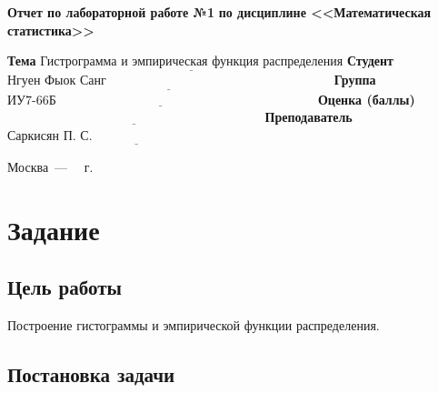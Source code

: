 \documentclass[12pt]{report}
\begin{document}
\begin{titlepage}
		\begin{center}
			\noindent\begin{minipage}{1.1\textwidth}\centering
				\Large\textbf{  Отчет по лабораторной работе №1}\newline
				\textbf{по дисциплине <<Математическая статистика>>}\newline\newline\newline
			\end{minipage}
		\end{center}
		
		\noindent\textbf{Тема} $\underline{\text{Гистрограмма и эмпирическая функция распределения}}$\newline\newline
		\noindent\textbf{Студент} $\underline{\text{Нгуен Фыок Санг~~~~~~~~~~~~~~~~~~~~~~~~~~~~~~~~~~~~~~~~~~~~~~~~~~~~~}}$\newline\newline
		\noindent\textbf{Группа} $\underline{\text{ИУ7-66Б~~~~~~~~~~~~~~~~~~~~~~~~~~~~~~~~~~~~~~~~~~~~~~~~~~~~~~~~~~~~~}}$\newline\newline
		\noindent\textbf{Оценка (баллы)} $\underline{\text{~~~~~~~~~~~~~~~~~~~~~~~~~~~~~~~~~~~~~~~~~~~~~~~~~~~~~~~~~~~~}}$\newline\newline
		\noindent\textbf{Преподаватель} $\underline{\text{Саркисян П. С.~~~~~~~~~~~~~~~~~~~~~~~~~~~~~~~~~~~~~~~~~}}$\newline\newline\newline
		
		\begin{center}
			\vfill
			Москва~---~\the\year
			~г.
		\end{center}
	\end{titlepage}

\chapter*{Задание}

\section*{Цель работы}
Построение гистограммы и эмпирической функции распределения.

\section*{Постановка задачи}
\end{document}
